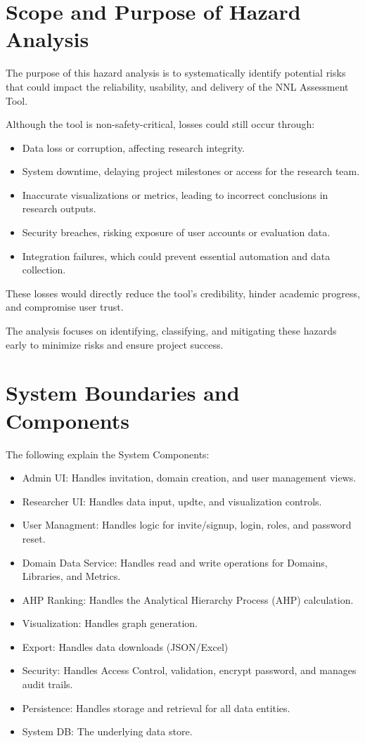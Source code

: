 \documentclass{article}
\begin{document}
\section{Scope and Purpose of Hazard Analysis}

The purpose of this hazard analysis is to systematically identify potential
risks that could impact the reliability, usability, and delivery of the NNL
Assessment Tool.

Although the tool is non-safety-critical, losses could still occur through:

\begin{itemize}
    \item Data loss or corruption, affecting research integrity.
    \item System downtime, delaying project milestones or access for the research team.
    \item Inaccurate visualizations or metrics, leading to incorrect conclusions in research outputs.
    \item Security breaches, risking exposure of user accounts or evaluation data.
    \item Integration failures, which could prevent essential automation and data collection.
\end{itemize}

These losses would directly reduce the tool’s credibility, hinder academic
progress, and compromise user trust.

The analysis focuses on identifying, classifying, and mitigating these hazards
early to minimize risks and ensure project success.

\section{System Boundaries and Components}

The following explain the System Components:
\begin{itemize}
    \item Admin UI: Handles invitation, domain creation, and user management views.
    \item Researcher UI: Handles data input, updte, and visualization controls.
    \item User Managment: Handles logic for invite/signup, login, roles, and password reset.
    \item Domain Data Service: Handles read and write operations for Domains, Libraries, and Metrics.
    \item AHP Ranking: Handles the Analytical Hierarchy Process (AHP) calculation.
    \item Visualization: Handles graph generation.
    \item Export: Handles data downloads (JSON/Excel)
    \item Security: Handles Access Control, validation, encrypt password, and manages audit trails.
    \item Persistence: Handles storage and retrieval for all data entities.
    \item System DB: The underlying data store.
\end{itemize}
\end{document}
